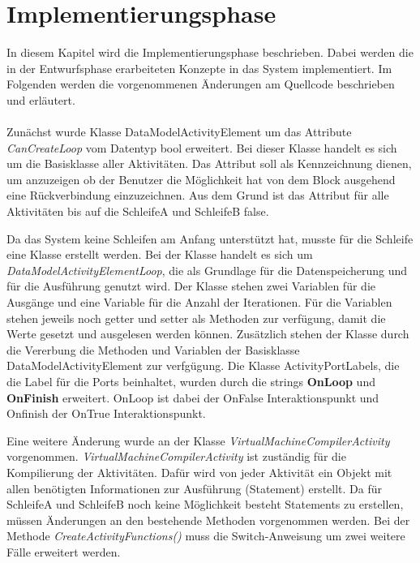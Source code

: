 \documentclass{article}
\begin{document}
    \section{Implementierungsphase}
    In diesem Kapitel wird die Implementierungsphase beschrieben. 
    Dabei werden die in der Entwurfsphase erarbeiteten Konzepte in das System implementiert. \cite{24}
    Im Folgenden werden die vorgenommenen Änderungen am Quellcode beschrieben und erläutert.\\
    \\
    Zunächst wurde Klasse DataModelActivityElement um das Attribute \textit{CanCreateLoop} vom Datentyp bool erweitert. 
    Bei dieser Klasse handelt es sich um die Basisklasse aller Aktivitäten.
    Das Attribut soll als Kennzeichnung dienen, um anzuzeigen ob der Benutzer die Möglichkeit hat von dem Block ausgehend eine Rückverbindung einzuzeichnen. 
    Aus dem Grund ist das Attribut für alle Aktivitäten bis auf die SchleifeA und SchleifeB false. \par
    Da das System keine Schleifen am Anfang unterstützt hat, musste für die Schleife eine Klasse erstellt werden.
    Bei der Klasse handelt es sich um \textit{DataModelActivityElementLoop}, die als Grundlage für die Datenspeicherung und für die Ausführung genutzt wird.
    Der Klasse stehen zwei Variablen für die Ausgänge und eine Variable für die Anzahl der Iterationen. 
    Für die Variablen stehen jeweils noch getter und setter als Methoden zur verfügung, damit die Werte gesetzt und ausgelesen werden können.
    Zusätzlich stehen der Klasse durch die Vererbung die Methoden und Variablen der Basisklasse DataModelActivityElement zur verfgügung.
    Die Klasse ActivityPortLabels, die die Label für die Ports beinhaltet, wurden durch die strings \textbf{OnLoop} und \textbf{OnFinish} erweitert.
    OnLoop ist dabei der OnFalse Interaktionspunkt und Onfinish der OnTrue Interaktionspunkt. \par
    Eine weitere Änderung wurde an der Klasse \textit{VirtualMachineCompilerActivity} vorgenommen.
    \textit{VirtualMachineCompilerActivity} ist zuständig für die Kompilierung der Aktivitäten. 
    Dafür wird von jeder Aktivität ein Objekt mit allen benötigten Informationen zur Ausführung (Statement) erstellt.
    Da für SchleifeA und SchleifeB noch keine Möglichkeit besteht Statements zu erstellen, müssen Änderungen an den bestehende Methoden vorgenommen werden.
    Bei der Methode \textit{CreateActivityFunctions()} muss die Switch-Anweisung um zwei weitere Fälle erweitert werden.
\end{document}
